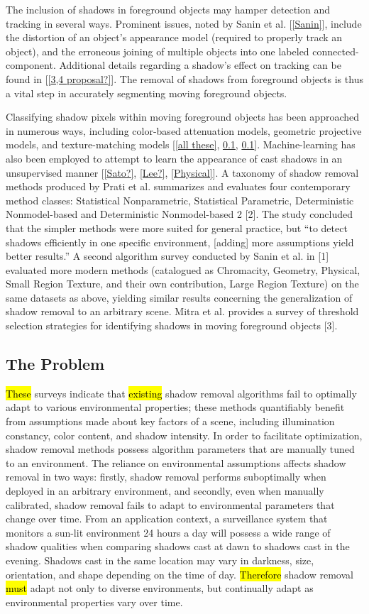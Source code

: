 \documentclass[12pt]{report}
\begin{document}
The inclusion of shadows in foreground objects may hamper detection and tracking in several ways. Prominent issues, noted by Sanin et al. [\ref{Sanin}], include the distortion of an object's appearance model (required to properly track an object), and the erroneous joining of multiple objects into one labeled connected-component. Additional details regarding a shadow's effect on tracking can be found in [\ref{3,4 proposal?}]. The removal of shadows from foreground objects is thus a vital step in accurately segmenting moving foreground objects.

Classifying shadow pixels within moving foreground objects has been approached in numerous ways, including color-based attenuation models, geometric projective models, and texture-matching models [\ref{all these}, \ref{}, \ref{}]. Machine-learning has also been employed to attempt to learn the appearance of cast shadows in an unsupervised manner [\ref{Sato?}, \ref{Lee?}, \ref{Physical}]. A taxonomy of shadow removal methods produced by Prati et al. summarizes and evaluates four contemporary method classes: Statistical Nonparametric, Statistical Parametric, Deterministic Nonmodel-based and Deterministic Nonmodel-based 2 [2]. The study concluded that the simpler methods were more suited for general practice, but ``to detect shadows efficiently in one specific environment, [adding] more assumptions yield better results.'' A second algorithm survey conducted by Sanin et al. in [1] evaluated more modern methods (catalogued as Chromacity, Geometry, Physical, Small Region Texture, and their own contribution, Large Region Texture) on the same datasets as above, yielding similar results concerning the generalization of shadow removal to an arbitrary scene. Mitra et al. provides a survey of threshold selection strategies for identifying shadows in moving foreground objects [3].

\subsection{The Problem}

\hl{These} surveys indicate that \hl{existing} shadow removal algorithms fail to optimally adapt to various environmental properties; these methods quantifiably benefit from assumptions made about key factors of a scene, including illumination constancy, color content, and shadow intensity. In order to facilitate optimization, shadow removal methods possess algorithm parameters that are manually tuned to an environment. The reliance on environmental assumptions affects shadow removal in two ways: firstly, shadow removal performs suboptimally when deployed in an arbitrary environment, and secondly, even when manually calibrated, shadow removal fails to adapt to environmental parameters that change over time. From an application context, a surveillance system that monitors a sun-lit environment 24 hours a day will possess a wide range of shadow qualities when comparing shadows cast at dawn to shadows cast in the evening. Shadows cast in the same location may vary in darkness, size, orientation, and shape depending on the time of day. \hl{Therefore} shadow removal \hl{must} adapt not only to diverse environments, but continually adapt as environmental properties vary over time.
\end{document}
